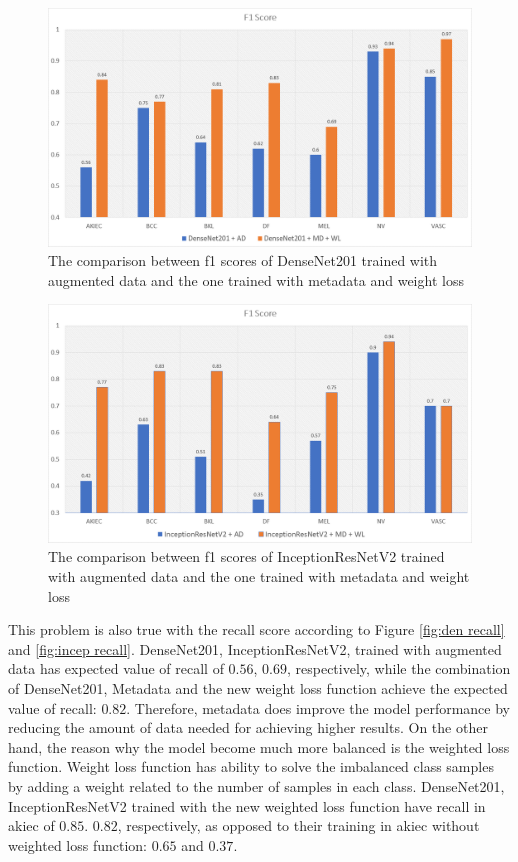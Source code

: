 \documentclass[sensors,article,submit,pdftex,moreauthors]{Definitions/mdpi}
\begin{document}
\begin{figure}[H]
	\centering
	\includegraphics[width=1\linewidth]{Definitions/den f1}
	\caption{The comparison between f1 scores of DenseNet201 trained with augmented data and the one trained with metadata and weight loss}
	\label{fig:den f1}
\end{figure}
\begin{figure}[H]
	\centering
	\includegraphics[width=1\linewidth]{Definitions/in f1}
	\caption{The comparison between f1 scores of InceptionResNetV2 trained with augmented data and the one trained with metadata and weight loss}
	\label{fig:incep f1}
\end{figure}

This problem is also true with the recall score according to Figure \ref{fig:den recall} and \ref{fig:incep recall}. DenseNet201, InceptionResNetV2, trained with augmented data has expected value of recall of $0.56$, $0.69$, respectively, while the combination of DenseNet201, Metadata and the new weight loss function achieve the expected value of recall: $0.82$. Therefore, metadata does improve the model performance by reducing the amount of data needed for achieving higher results. On the other hand, the reason why the model become much more balanced is the weighted loss function. Weight loss function has ability to solve the imbalanced class samples by adding a weight related to the number of samples in each class. DenseNet201, InceptionResNetV2 trained with the new weighted loss function have recall in akiec of $0.85$. $0.82$, respectively, as opposed to their training in akiec without weighted loss function: $0.65$ and $0.37$. 
\end{document}
